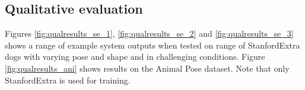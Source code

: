 \subsection{Qualitative evaluation}

Figures \ref{fig:qualresults_se_1}, \ref{fig:qualresults_se_2} and \ref{fig:qualresults_se_3} shows a range of example system outputs when tested on range of StanfordExtra dogs with varying pose and shape and in challenging conditions. Figure \ref{fig:qualresults_ani} shows results on the Animal Pose dataset. Note that only StanfordExtra is used for training.


% 

% 

% 

